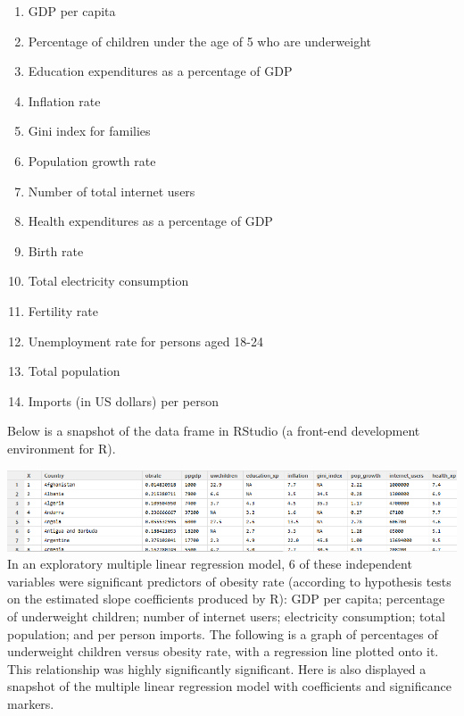 \documentclass[oneside,12pt]{report}
\begin{document}
\begin{enumerate}

\item GDP per capita

\item Percentage of children under the age of 5 who are underweight

\item Education expenditures as a percentage of GDP

\item Inflation rate

\item Gini index for families

\item Population growth rate

\item Number of total internet users

\item Health expenditures as a percentage of GDP

\item Birth rate

\item Total electricity consumption

\item Fertility rate

\item Unemployment rate for persons aged 18-24

\item Total population

\item Imports (in US dollars) per person

\end{enumerate}


Below is a snapshot of the data frame in RStudio (a front-end development environment for R).

\includegraphics[width=\textwidth]{dataframe_snapshot.png}\\

In an exploratory multiple linear regression model, 6 of these independent variables were significant predictors of obesity rate (according to hypothesis tests on the estimated slope coefficients produced by R): GDP per capita; percentage of underweight children; number of internet users; electricity consumption; total population; and per person imports. The following is a graph of percentages of underweight children versus obesity rate, with a regression line plotted onto it. This relationship was highly significantly significant. Here is also displayed a snapshot of the multiple linear regression model with coefficients and significance markers.
\end{document}
